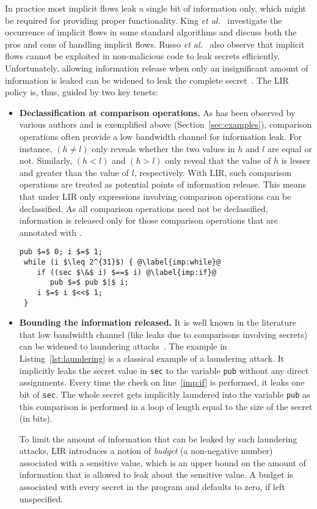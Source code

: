 In practice most implicit flows leak a single bit of information only,
which might be required for providing proper functionality. King
\emph{et al.}~\cite{king08implicit} investigate the occurrence of
implicit flows in some standard algorithms and discuss both the pros
and cons of handling implicit flows. Russo \emph{et
  al.}~\cite{implicit} also observe that implicit flows cannot be
exploited in non-malicious code to leak secrets
efficiently. Unfortunately, allowing information release when only an
insignificant amount of information is leaked can be widened to leak
the complete secret~\cite{relSec,delRelease}.  The LIR policy is,
thus, guided by two key tenets: 
\begin{itemize}
\item \textbf{Declassification at comparison operations.}
As has been observed by various authors \cite{scd, dta} and is exemplified
above (Section~\ref{sec:examples}), comparison operations often
provide a low bandwidth channel for information
leak. For instance, $(h \neq l)$ only reveals whether the two values
in $h$ and $l$ are equal or not. Similarly, $(h < l)$ and $(h > l)$
only reveal that the value of $h$ is lesser and greater than the value
of $l$, respectively. With LIR, such comparison operations are treated
as potential points of information release. This means that 
under LIR only expressions involving comparison operations can be
declassified. 
As all comparison operations need not be declassified, information is
released only for those comparison operations that are annotated with
. 

\begin{lstlisting}[float, caption=Laundering attack via implicit flow, label=lst:laundering]
 pub $=$ 0; i $=$ 1;
 while (i $\leq 2^{31}$) { @\label{imp:while}@
    if ((sec $\&$ i) $==$ i) @\label{imp:if}@
       pub $=$ pub $|$ i;
    i $=$ i $<<$ 1;
 }
\end{lstlisting}

\item \textbf{Bounding the information released.}
It is well known in the literature that low bandwidth channel (like leaks due
to comparisons involving secrets) can be widened to laundering
attacks~\cite{relSec,delRelease}. The example in Listing~\ref{lst:laundering} is
a classical example of a laundering attack. It implicitly leaks the secret value
in \texttt{sec} to the variable \texttt{pub} without any direct assignments.
Every time the check on line~\ref{imp:if} is performed, it leaks one
bit of \texttt{sec}. The whole secret gets implicitly laundered into
the variable \texttt{pub} as this comparison is performed in a loop of 
length equal to the size of the secret (in bits).

To limit the amount of information that can be leaked by such
laundering attacks, LIR introduces a notion of \emph{budget} (a
non-negative number) associated with a sensitive value, which is an
upper bound on the amount of information that is allowed to leak about
the sensitive value. A budget is associated with every secret in the
program and defaults to zero, if left unspecified. 
\end{itemize}

